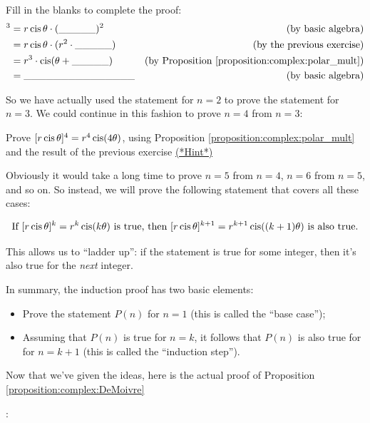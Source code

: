 {\begin{exercise}\label{exercise:complex:28} Fill in the blanks to complete the proof:
\begin{align*}
[r\cis\theta]^{3} &= r\cis\theta \cdot (\_\_\_\_\_)^{2} & \mbox{(by basic algebra)} \\
 &=  r\cis\theta \cdot (r^{2} \cdot \_\_\_\_\_) & \mbox{(by the previous exercise)}\\
 &=  r^{3} \cdot \cis( \theta +  \_\_\_\_\_) & \mbox{(by Proposition \ref{proposition:complex:polar_mult})}\\
 &=   \_\_\_\_\_\_\_\_\_\_\_\_\_\_\_ & \mbox{(by basic algebra)}\\
\end{align*}
\end{exercise}

\noindent So we have actually used the statement for $n=2$ to prove the statement for $n=3$. We could continue in this fashion to prove $n=4$ from $n=3$:

\begin{exercise}\label{exercise:complex:29} Prove $[r\operatorname{cis}\theta]^{4}=r^{4}\operatorname{cis}(4\theta)$, using Proposition
\ref{proposition:complex:polar_mult} and the result of the previous exercise 
\hyperref[sec:complex:hints]{(*Hint*)}
\end{exercise}

 \noindent Obviously it would take a long time to prove $n=5$ from $n=4$, $n=6$ from $n=5$, and so on. So instead, we will prove the following statement that covers all these cases:

\[ \mbox{If } [r\operatorname{cis}\theta]^{k}=r^{k}\operatorname{cis}(k\theta) \mbox{ is true, then } [r\operatorname{cis}\theta]^{k+1}=r^{k+1}\operatorname{cis}((k+1)\theta) \mbox{ is also true.} \]

This allows us to ``ladder up'': if the statement is true for some integer, then it's also true for the {\it next} integer.

In summary, the induction proof has two basic elements:
\begin{itemize}
\item
Prove the statement $P(n)$ for $n=1$ (this is called the ``base case'');
\item
Assuming that $P(n)$  is true for $n=k$, it follows that $P(n)$  is also true for for $n=k+1$ (this is called the ``induction step'').
\end{itemize}

\noindent Now that we've given the ideas, here is the actual proof  of Proposition \ref{proposition:complex:DeMoivre}}:
\medskip{}
